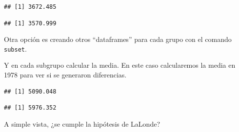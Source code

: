 \documentclass[
]{article}
\newenvironment{Shaded}{\begin{snugshade}}{\end{snugshade}}
\newcommand{\DecValTok}[1]{\textcolor[rgb]{0.00,0.00,0.81}{#1}}
\newcommand{\FunctionTok}[1]{\textcolor[rgb]{0.00,0.00,0.00}{#1}}
\newcommand{\NormalTok}[1]{#1}
\newcommand{\OtherTok}[1]{\textcolor[rgb]{0.56,0.35,0.01}{#1}}
\newcommand{\SpecialCharTok}[1]{\textcolor[rgb]{0.00,0.00,0.00}{#1}}
\begin{document}
\begin{verbatim}
## [1] 3672.485
\end{verbatim}

\begin{Shaded}
\end{Shaded}

\begin{verbatim}
## [1] 3570.999
\end{verbatim}

Otra opción es creando otros ``dataframes'' para cada grupo con el
comando \texttt{subset}.

\begin{Shaded}
\end{Shaded}

Y en cada subgrupo calcular la media. En este caso calcularemos la media
en 1978 para ver si se generaron diferencias.

\begin{Shaded}
\end{Shaded}

\begin{verbatim}
## [1] 5090.048
\end{verbatim}

\begin{Shaded}
\end{Shaded}

\begin{verbatim}
## [1] 5976.352
\end{verbatim}

A simple vista, ¿se cumple la hipótesis de LaLonde?
\end{document}
